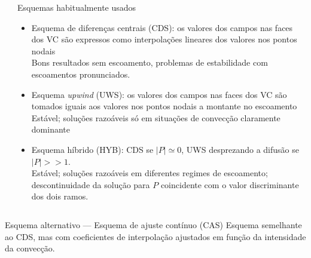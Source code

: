\documentclass[final,t]{beamer}
\begin{document}
\begin{frame}{}
\begin{columns}[t]
\begin{column}{0.488\linewidth}
\end{column}


\hfill
\begin{column}{.488\linewidth}
    \begin{block}{Esquemas habitualmente usados}
        \begin{itemize}
            \item Esquema de diferenças centrais (CDS): os valores dos campos
                nas faces dos VC são expressos como interpolações lineares dos
                valores nos pontos nodais\\
                Bons resultados sem escoamento, problemas de estabilidade com
                escoamentos pronunciados.
            \item Esquema \emph{upwind} (UWS): os valores dos campos nas  faces
                dos VC são tomados iguais aos valores nos pontos nodais a
                montante no escoamento\\
                Estável; soluções razoáveis só em situações de convecção
                claramente dominante
            \item Esquema híbrido (HYB): CDS se $|P|\simeq0$, UWS desprezando a
                difusão se $|P|>>1$.\\
                Estável; soluções razoáveis em diferentes regimes de escoamento;
                descontinuidade da solução para $P$ coincidente com o valor
                discriminante dos dois ramos.
                \rule[-13.5mm]{0mm}{1mm}
        \end{itemize}
    \end{block}
\end{column}
  
\end{columns}

\begin{columns}[t]
\begin{column}{\linewidth}
\begin{exampleblock}{Esquema alternativo --- Esquema de ajuste contínuo
    (CAS)}
    Esquema semelhante ao CDS, mas com coeficientes de interpolação ajustados
    em função da intensidade da convecção.
    \strut


\end{exampleblock}
\end{column}
\end{columns}
\end{frame}
\end{document}
